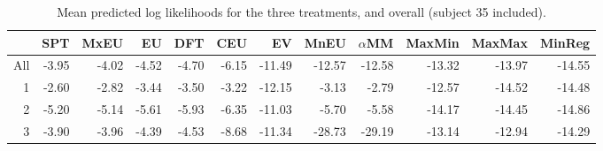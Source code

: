\begin{table}[!htb]
\centering
\begin{tabular}{rrrrrrrrrrrr}
  \hline
 & SPT & MxEU & EU & DFT & CEU & EV & MnEU & $\alpha$MM & MaxMin & MaxMax & MinReg \\ 
  \hline
All & -3.95 & -4.02 & -4.52 & -4.70 & -6.15 & -11.49 & -12.57 & -12.58 & -13.32 & -13.97 & -14.55 \\ 
  1 & -2.60 & -2.82 & -3.44 & -3.50 & -3.22 & -12.15 & -3.13 & -2.79 & -12.57 & -14.52 & -14.48 \\ 
  2 & -5.20 & -5.14 & -5.61 & -5.93 & -6.35 & -11.03 & -5.70 & -5.58 & -14.17 & -14.45 & -14.86 \\ 
  3 & -3.90 & -3.96 & -4.39 & -4.53 & -8.68 & -11.34 & -28.73 & -29.19 & -13.14 & -12.94 & -14.29 \\ 
   \hline
\end{tabular}
\caption{Mean predicted log likelihoods for the three treatments, and overall (subject 35 included).} 
\label{table_A_mean_plike}
\end{table}
